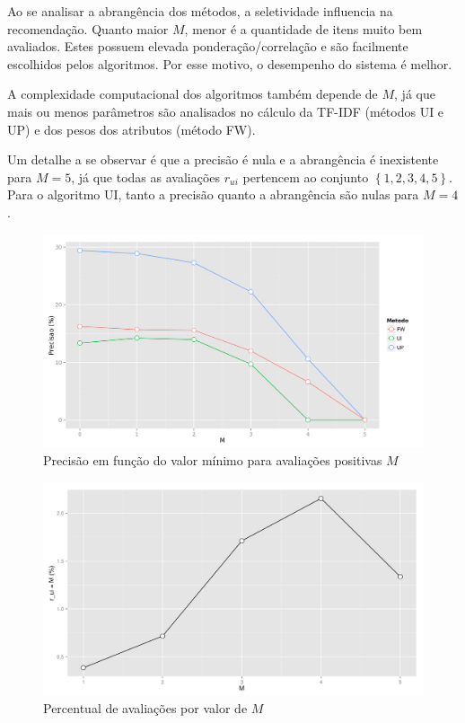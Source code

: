 Ao se analisar a abrangência dos métodos, a seletividade influencia na recomendação. Quanto maior $M$, menor é a quantidade de itens muito bem avaliados. Estes possuem elevada ponderação/correlação e são facilmente escolhidos pelos algoritmos. Por esse motivo, o desempenho do sistema é melhor.

A complexidade computacional dos algoritmos também depende de $M$, já que mais ou menos parâmetros são analisados no cálculo da TF-IDF (métodos UI e UP) e dos pesos dos atributos (método FW).

Um detalhe a se observar é que a precisão é nula e a abrangência é inexistente para $M=5$, já que todas as avaliações $r_{ui}$ pertencem ao conjunto $\left\{1,2,3,4,5\right\}$. 
Para o algoritmo UI, tanto a precisão quanto a abrangência são nulas para $M=4$.

\begin{figure}[htp]
    \begin{center}
    \includegraphics[width=1\textwidth]{img/precision_M}
    \end{center}
    \caption{Precisão em função do valor mínimo para avaliações positivas $M$}
    \label{fig:precision_M}
\end{figure}

\begin{figure}[htp]
    \begin{center}
    \includegraphics[width=1\textwidth]{img/percentual_M}
    \end{center}
    \caption{Percentual de avaliações por valor de $M$}
    \label{fig:percentual_M}
\end{figure}

